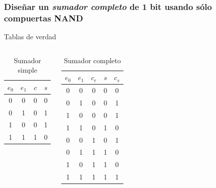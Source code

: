\documentclass[mathserif,hyperref]{beamer}
\begin{document}
\begin{frame}
\frametitle{\small Diseñar un \textit{sumador completo} de 1 bit usando sólo
compuertas NAND}
Tablas de verdad
\begin{columns}
    \pause
    \begin{center}\begin{table}
    \begin{tabular}{| c | c || c | c |}
      \hline
      $e_0$ & $e_1$ & $c$ & $s$ \\ \hline
        0   &   0   &  0  &  0  \\
        0   &   1   &  0  &  1  \\
        1   &   0   &  0  &  1  \\
        1   &   1   &  1  &  0  \\
      \hline
    \end{tabular}
    \caption*{Sumador simple}
    \end{table}\end{center}
    \pause
    \begin{center}\begin{table}
    \begin{tabular}{| c | c | c || c | c |}
      \hline
      $e_0$ & $e_1$ & $c_e$ & $s$ & $c_s$ \\ \hline
        0   &   0   &   0   &  0  &   0   \\
        0   &   1   &   0   &  0  &   1   \\
        1   &   0   &   0   &  0  &   1   \\
        1   &   1   &   0   &  1  &   0   \\
        0   &   0   &   1   &  0  &   1   \\
        0   &   1   &   1   &  1  &   0   \\
        1   &   0   &   1   &  1  &   0   \\
        1   &   1   &   1   &  1  &   1   \\
      \hline
    \end{tabular}
    \caption*{Sumador completo}
    \end{table}\end{center}
\end{columns}
\end{frame}
\end{document}
